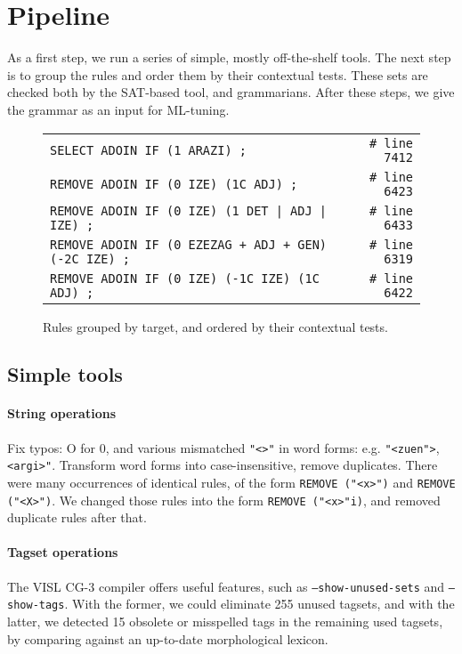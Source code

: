 \documentclass[11pt]{article}
\def\t#1{\texttt{#1}}
\begin{document}
\section{Pipeline}

As a first step, we run a series of simple, mostly off-the-shelf tools. 
The next step is to group the rules and order them by their contextual tests.
These sets are checked both by the SAT-based tool, and grammarians. After these
steps, we give the grammar as an input for ML-tuning.


\begin{figure*}[t]
\centering
\label{fig:sorted}
\begin{tabular}{lr}
\t{SELECT ADOIN IF (1 ARAZI) ;}                         & \t{\# line 7412} \\
\t{REMOVE ADOIN IF (0 IZE) (1C ADJ) ;}                  & \t{\# line 6423} \\
\t{REMOVE ADOIN IF (0 IZE) (1 DET | ADJ | IZE) ;}       & \t{\# line 6433} \\
\t{REMOVE ADOIN IF (0 EZEZAG + ADJ + GEN) (-2C IZE) ;}  & \t{\# line 6319} \\
\t{REMOVE ADOIN IF (0 IZE) (-1C IZE) (1C ADJ) ;}        & \t{\# line 6422} \\
\end{tabular}
\caption{Rules grouped by target, and ordered by their contextual tests.}

\end{figure*}



\subsection{Simple tools}

\paragraph{String operations}
Fix typos: O for 0, and various mismatched \texttt{"<>"} in word forms: e.g. \texttt{"<zuen">}, \texttt{<argi>"}.
Transform word forms into case-insensitive, remove duplicates. 
There were many occurrences of identical rules, of the form \texttt{REMOVE ("<x>")} and \texttt{REMOVE ("<X>")}. We changed those rules into the form \texttt{REMOVE ("<x>"i)}, and removed duplicate rules after that.

\paragraph{Tagset operations}
The VISL CG-3 compiler offers useful features, such as \texttt{--show-unused-sets} and \texttt{--show-tags}. With the former, we could eliminate 255 unused tagsets, and with the latter, we detected 15 obsolete or misspelled tags in the remaining used tagsets, by comparing against an up-to-date morphological lexicon.
\end{document}
